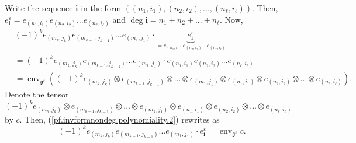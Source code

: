 \documentclass
[numbers=enddot,12pt,final,onecolumn,german,notitlepage]{scrartcl}%
\theoremstyle{definition}
\begin{document}
Write the sequence $\mathbf{i}$ in the form $\left(  \left(  n_{1}%
,i_{1}\right)  ,\left(  n_{2},i_{2}\right)  ,...,\left(  n_{\ell},i_{\ell
}\right)  \right)  $. Then, $e_{\mathbf{i}}^{\varepsilon}=e_{\left(
n_{1},i_{1}\right)  }e_{\left(  n_{2},i_{2}\right)  }...e_{\left(  n_{\ell
},i_{\ell}\right)  }$ and $\deg\mathbf{i}=n_{1}+n_{2}+...+n_{\ell}$. Now,%
\begin{align}
&  \left(  -1\right)  ^{k}e_{\left(  m_{k},j_{k}\right)  }e_{\left(
m_{k-1},j_{k-1}\right)  }...e_{\left(  m_{1},j_{1}\right)  }\cdot
\underbrace{e_{\mathbf{i}}^{\varepsilon}}_{=e_{\left(  n_{1},i_{1}\right)
}e_{\left(  n_{2},i_{2}\right)  }...e_{\left(  n_{\ell},i_{\ell}\right)  }%
}\nonumber\\
&  =\left(  -1\right)  ^{k}e_{\left(  m_{k},j_{k}\right)  }e_{\left(
m_{k-1},j_{k-1}\right)  }...e_{\left(  m_{1},j_{1}\right)  }\cdot e_{\left(
n_{1},i_{1}\right)  }e_{\left(  n_{2},i_{2}\right)  }...e_{\left(  n_{\ell
},i_{\ell}\right)  }\nonumber\\
&  =\operatorname*{env}\nolimits_{\mathfrak{g}^{\varepsilon}}\left(  \left(
-1\right)  ^{k}e_{\left(  m_{k},j_{k}\right)  }\otimes e_{\left(
m_{k-1},j_{k-1}\right)  }\otimes...\otimes e_{\left(  m_{1},j_{1}\right)
}\otimes e_{\left(  n_{1},i_{1}\right)  }\otimes e_{\left(  n_{2}%
,i_{2}\right)  }\otimes...\otimes e_{\left(  n_{\ell},i_{\ell}\right)
}\right)  . \label{pf.invformnondeg.polynomiality.2}%
\end{align}
Denote the tensor $\left(  -1\right)  ^{k}e_{\left(  m_{k},j_{k}\right)
}\otimes e_{\left(  m_{k-1},j_{k-1}\right)  }\otimes...\otimes e_{\left(
m_{1},j_{1}\right)  }\otimes e_{\left(  n_{1},i_{1}\right)  }\otimes
e_{\left(  n_{2},i_{2}\right)  }\otimes...\otimes e_{\left(  n_{\ell},i_{\ell
}\right)  }$ by $c$. Then, (\ref{pf.invformnondeg.polynomiality.2}) rewrites
as%
\begin{equation}
\left(  -1\right)  ^{k}e_{\left(  m_{k},j_{k}\right)  }e_{\left(
m_{k-1},j_{k-1}\right)  }...e_{\left(  m_{1},j_{1}\right)  }\cdot
e_{\mathbf{i}}^{\varepsilon}=\operatorname*{env}\nolimits_{\mathfrak{g}%
^{\varepsilon}}c. \label{pf.invformnondeg.polynomiality.3}%
\end{equation}
\end{document}
